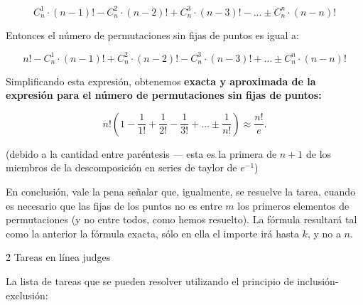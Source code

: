 $$ C_n^1 \cdot (n-1)! - C_n^2 \cdot (n-2)! + C_n^3 \cdot (n-3)! - \ldots \pm C_n^n \cdot (n-n)! $$

Entonces el número de permutaciones sin fijas de puntos es igual a:

$$ n! - C_n^1 \cdot (n-1)! + C_n^2 \cdot (n-2)! - C_n^3 \cdot (n-3)! + \ldots \pm C_n^n \cdot (n-n)! $$

Simplificando esta expresión, obtenemos \bf{exacta y aproximada de la expresión para el número de permutaciones sin fijas de puntos}:

$$ n! \left( 1 - \frac{1}{1!} + \frac{1}{2!} - \frac{1}{3!} + \ldots \pm \frac{1}{n!} \right) \approx \frac{n!}{e}. $$

(debido a la cantidad entre paréntesis --- esta es la primera de $n+1$ de los miembros de la descomposición en series de taylor de $e^{-1}$)

En conclusión, vale la pena señalar que, igualmente, se resuelve la tarea, cuando es necesario que las fijas de los puntos no es entre $m$ los primeros elementos de permutaciones (y no entre todos, como hemos resuelto). La fórmula resultará tal como la anterior la fórmula exacta, sólo en ella el importe irá hasta $k$, y no a $n$.



\h2{ Tareas en línea judges }

La lista de tareas que se pueden resolver utilizando el principio de inclusión-exclusión:

